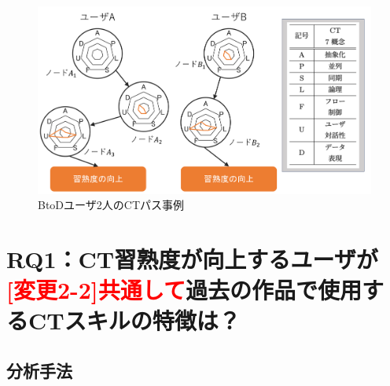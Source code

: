 \documentclass[submit]{ipsj}
\begin{document}
\begin{figure}[t]
    \centering
    \includegraphics[width=1.0\linewidth]{Okamoto_fig/graph.pdf}
    \caption{BtoDユーザ2人のCTパス事例}
    \label{fig:digraph}
    \vspace{-4mm}
\end{figure}

\section{RQ1：CT習熟度が向上するユーザが\textcolor{red}{[変更2-2]共通して}過去の作品で使用するCTスキルの特徴は？}\label{sec:chapter_3-2}
\subsection{分析手法}\label{sec:rq1-approach}
\end{document}
